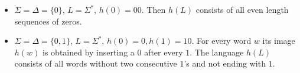 

\setcounter{section}{3}
\setcounter{subsection}{3}
\setcounter{dfn}{11}

\begin{exl}
\begin{itemize}
\item
$\Sigma = \Delta = \{0\}$, $L = \Sigma^*$, $h(0) = 00$. Then $h(L)$ consists of all even length sequences of zeros.
\item
$\Sigma = \Delta = \{0, 1\}$, $L = \Sigma^*$, $h(0) = 0, h(1) = 10$. For every word $w$ its image $h(w)$ is obtained by inserting a $0$ after every $1$.
The language $h(L)$ consists of all words without two consecutive $1$'s and not ending with $1$.
\end{itemize}
\end{exl}

